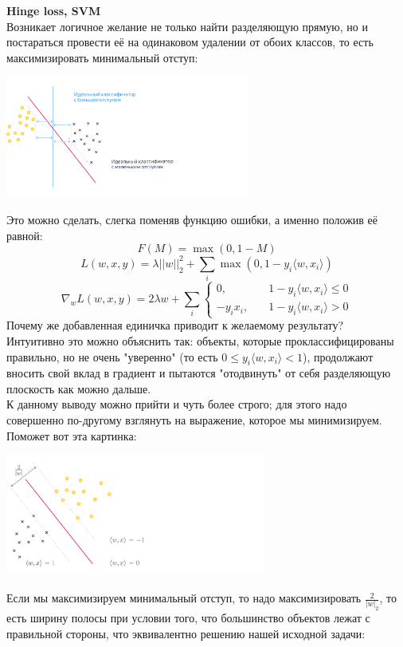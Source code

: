 \textbf{Hinge loss, SVM} \\
Возникает логичное желание не только найти разделяющую прямую, но и постараться провести её на одинаковом удалении от обоих классов, то есть максимизировать минимальный отступ:
\begin{center}
    \centering
    \includegraphics[height=4cm]{pics/t_osn24_4.png}
\end{center}
Это можно сделать, слегка поменяв функцию ошибки, а именно положив её равной:
$$F(M) = \max(0, 1-M)$$
$$L(w, x, y) = \lambda||w||^2_2 + \sum_i \max(0, 1-y_i \langle w, x_i\rangle)$$
$$\nabla_w L(w, x, y) = 2 \lambda w + \sum_i
        \begin{cases} 
             0,      & \quad      1 - y_i \langle w, x_i \rangle \leq 0 \\ 
            - y_i x_i, & \quad   1 - y_i \langle w, x_i \rangle > 0
        \end{cases}$$ 
Почему же добавленная единичка приводит к желаемому результату? \\ Интуитивно это можно объяснить так: объекты, которые проклассифицированы правильно, но не очень "уверенно" (то есть $0 \leq y_i \langle w, x_i\rangle < 1$), продолжают вносить свой вклад в градиент и пытаются "отодвинуть" от себя разделяющую плоскость как можно дальше. \\
К данному выводу можно прийти и чуть более строго; для этого надо совершенно по-другому взглянуть на выражение, которое мы минимизируем. Поможет вот эта картинка:
\begin{center}
    \includegraphics[height=4cm]{pics/t_osn24_5.png}
\end{center}
Если мы максимизируем минимальный отступ, то надо максимизировать $\frac{2}{|w|_2}$, то есть ширину полосы при условии того, что большинство объектов лежат с правильной стороны, что эквивалентно решению нашей исходной задачи:
